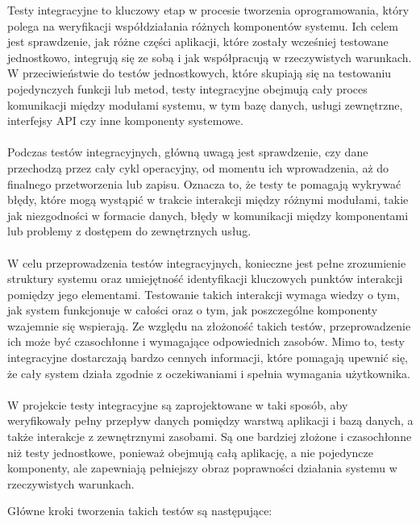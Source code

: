 \documentclass[twoside]{projektInzynierskiMS1}
\begin{document}
\noindent
Testy integracyjne to kluczowy etap w procesie tworzenia oprogramowania, który polega na weryfikacji współdziałania różnych komponentów systemu. Ich celem jest sprawdzenie, jak różne części aplikacji, które zostały wcześniej testowane jednostkowo, integrują się ze sobą i jak współpracują w rzeczywistych warunkach. W przeciwieństwie do testów jednostkowych, które skupiają się na testowaniu pojedynczych funkcji lub metod, testy integracyjne obejmują cały proces komunikacji między modułami systemu, w tym bazę danych, usługi zewnętrzne, interfejsy API czy inne komponenty systemowe.
\\\\
Podczas testów integracyjnych, główną uwagą jest sprawdzenie, czy dane przechodzą przez cały cykl operacyjny, od momentu ich wprowadzenia, aż do finalnego przetworzenia lub zapisu. Oznacza to, że testy te pomagają wykrywać błędy, które mogą wystąpić w trakcie interakcji między różnymi modułami, takie jak niezgodności w formacie danych, błędy w komunikacji między komponentami lub problemy z dostępem do zewnętrznych usług.
\\\\
W celu przeprowadzenia testów integracyjnych, konieczne jest pełne zrozumienie struktury systemu oraz umiejętność identyfikacji kluczowych punktów interakcji pomiędzy jego elementami. Testowanie takich interakcji wymaga wiedzy o tym, jak system funkcjonuje w całości oraz o tym, jak poszczególne komponenty wzajemnie się wspierają. Ze względu na złożoność takich testów, przeprowadzenie ich może być czasochłonne i wymagające odpowiednich zasobów. Mimo to, testy integracyjne dostarczają bardzo cennych informacji, które pomagają upewnić się, że cały system działa zgodnie z oczekiwaniami i spełnia wymagania użytkownika.
\\\\
W projekcie testy integracyjne są zaprojektowane w taki sposób, aby weryfikowały pełny przepływ danych pomiędzy warstwą aplikacji i bazą danych, a także interakcje z zewnętrznymi zasobami. Są one bardziej złożone i czasochłonne niż testy jednostkowe, ponieważ obejmują całą aplikację, a nie pojedyncze komponenty, ale zapewniają pełniejszy obraz poprawności działania systemu w rzeczywistych warunkach. 

\newpage

\noindent
Główne kroki tworzenia takich testów są następujące:
\end{document}
